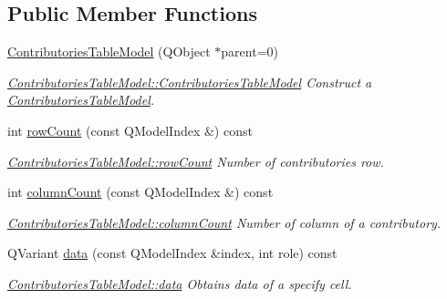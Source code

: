 \subsection*{Public Member Functions}
\begin{DoxyCompactItemize}
\item 
\hyperlink{classGui_1_1Widgets_1_1WdgModels_1_1ContributoriesTableModel_abfc7cdc96006729fa8b03571bb8b586b}{Contributories\-Table\-Model} (Q\-Object $\ast$parent=0)
\begin{DoxyCompactList}\small\item\em \hyperlink{classGui_1_1Widgets_1_1WdgModels_1_1ContributoriesTableModel_abfc7cdc96006729fa8b03571bb8b586b}{Contributories\-Table\-Model\-::\-Contributories\-Table\-Model} Construct a \hyperlink{classGui_1_1Widgets_1_1WdgModels_1_1ContributoriesTableModel}{Contributories\-Table\-Model}. \end{DoxyCompactList}\item 
int \hyperlink{classGui_1_1Widgets_1_1WdgModels_1_1ContributoriesTableModel_a4adfd94506448337ceac8504b76531aa}{row\-Count} (const Q\-Model\-Index \&) const 
\begin{DoxyCompactList}\small\item\em \hyperlink{classGui_1_1Widgets_1_1WdgModels_1_1ContributoriesTableModel_a4adfd94506448337ceac8504b76531aa}{Contributories\-Table\-Model\-::row\-Count} Number of contributories row. \end{DoxyCompactList}\item 
int \hyperlink{classGui_1_1Widgets_1_1WdgModels_1_1ContributoriesTableModel_ab052217cb08f856ecfe465458f95c174}{column\-Count} (const Q\-Model\-Index \&) const 
\begin{DoxyCompactList}\small\item\em \hyperlink{classGui_1_1Widgets_1_1WdgModels_1_1ContributoriesTableModel_ab052217cb08f856ecfe465458f95c174}{Contributories\-Table\-Model\-::column\-Count} Number of column of a contributory. \end{DoxyCompactList}\item 
Q\-Variant \hyperlink{classGui_1_1Widgets_1_1WdgModels_1_1ContributoriesTableModel_aa95bb13ea63275f96187150a8a2d3972}{data} (const Q\-Model\-Index \&index, int role) const 
\begin{DoxyCompactList}\small\item\em \hyperlink{classGui_1_1Widgets_1_1WdgModels_1_1ContributoriesTableModel_aa95bb13ea63275f96187150a8a2d3972}{Contributories\-Table\-Model\-::data} Obtains data of a specify cell. \end{DoxyCompactList}\item 

\end{DoxyCompactItemize}
